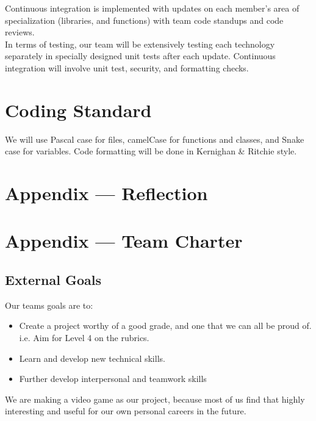 \documentclass{article}
\begin{document}
Continuous integration is implemented with updates on each member’s area of specialization (libraries, and functions) with team code standups and code reviews.\\

In terms of testing, our team will be extensively testing each technology separately in specially designed unit tests after each update. Continuous integration will involve unit test, security, and formatting checks.


\section{Coding Standard}

We will use Pascal case for files, camelCase for functions and classes, and Snake case for variables. Code formatting will be done in Kernighan \& Ritchie style.

\newpage{}

\section*{Appendix --- Reflection}



\newpage{}

\section*{Appendix --- Team Charter}


\subsection*{External Goals}

Our teams goals are to:
\begin{itemize}
\item{Create a project worthy of a good grade, and one that we can all be proud of. i.e. Aim for Level 4 on the rubrics.}
\item{Learn and develop new technical skills.}
\item{Further develop interpersonal and teamwork skills}
\end{itemize}

We are making a video game as our project, because most of us find that highly interesting and useful for our own personal careers in the future.\\
\end{document}

